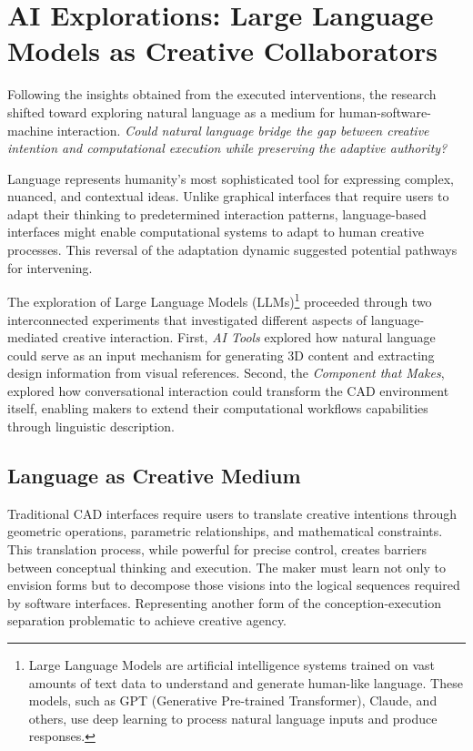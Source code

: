 \section{AI Explorations: Large Language Models as Creative Collaborators}

Following the insights obtained from the executed interventions, the research shifted toward exploring natural language as a medium for human-software-machine interaction. \textit{Could natural language bridge the gap between creative intention and computational execution while preserving the adaptive authority?}

\vspace{0.5cm}

Language represents humanity's most sophisticated tool for expressing complex, nuanced, and contextual ideas. Unlike graphical interfaces that require users to adapt their thinking to predetermined interaction patterns, language-based interfaces might enable computational systems to adapt to human creative processes. This reversal of the adaptation dynamic suggested potential pathways for intervening.

\vspace{0.5cm}

The exploration of Large Language Models (LLMs)\footnote{Large Language Models are artificial intelligence systems trained on vast amounts of text data to understand and generate human-like language. These models, such as GPT (Generative Pre-trained Transformer), Claude, and others, use deep learning to process natural language inputs and produce responses.} proceeded through two interconnected experiments that investigated different aspects of language-mediated creative interaction. First, \textit{AI Tools} explored how natural language could serve as an input mechanism for generating 3D content and extracting design information from visual references. Second, the \textit{Component that Makes}, explored how conversational interaction could transform the CAD environment itself, enabling makers to extend their computational workflows capabilities through linguistic description.

\subsection{Language as Creative Medium}

Traditional CAD interfaces require users to translate creative intentions through geometric operations, parametric relationships, and mathematical constraints. This translation process, while powerful for precise control, creates barriers between conceptual thinking and execution. The maker must learn not only to envision forms but to decompose those visions into the logical sequences required by software interfaces. Representing another form of the conception-execution separation problematic to achieve creative agency.

